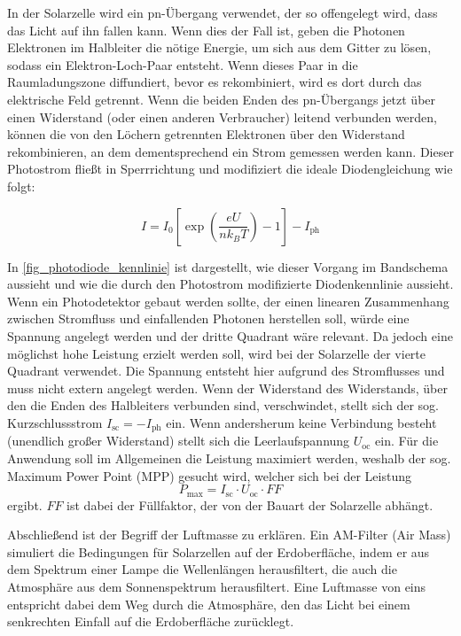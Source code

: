 \documentclass[
	a4paper,
	12pt,
	pagesize,
	ngerman
]{scrartcl}
\begin{document}
	In der Solarzelle wird ein pn-Übergang verwendet, der so offengelegt wird, dass das Licht auf ihn fallen kann.
	Wenn dies der Fall ist, geben die Photonen Elektronen im Halbleiter die nötige Energie, um sich aus dem Gitter zu lösen, sodass ein Elektron-Loch-Paar entsteht.
	Wenn dieses Paar in die Raumladungszone diffundiert, bevor es rekombiniert, wird es dort durch das elektrische Feld getrennt.
	Wenn die beiden Enden des pn-Übergangs jetzt über einen Widerstand (oder einen anderen Verbraucher) leitend verbunden werden, können die von den Löchern getrennten Elektronen über den Widerstand rekombinieren, an dem dementsprechend ein Strom gemessen werden kann.
	Dieser Photostrom fließt in Sperrrichtung und modifiziert die ideale Diodengleichung \label{eq_diode_real} wie folgt:

	\begin{equation}
			\label{eq_photostrom}
			I = I_0 \left[\exp{\left(\frac{eU}{n k_B T}\right)}-1\right]-I_\text{ph}
	\end{equation}

	In \cref{fig_photodiode_kennlinie} ist dargestellt, wie dieser Vorgang im Bandschema aussieht und wie die durch den Photostrom modifizierte Diodenkennlinie aussieht.
	Wenn ein Photodetektor gebaut werden sollte, der einen linearen Zusammenhang zwischen Stromfluss und einfallenden Photonen herstellen soll, würde eine Spannung angelegt werden und der dritte Quadrant wäre relevant.
	Da jedoch eine möglichst hohe Leistung erzielt werden soll, wird bei der Solarzelle der vierte Quadrant verwendet.
	Die Spannung entsteht hier aufgrund des Stromflusses und muss nicht extern angelegt werden.
	Wenn der Widerstand des Widerstands, über den die Enden des Halbleiters verbunden sind, verschwindet, stellt sich der sog. Kurzschlussstrom $ I_\text{sc} = - I_\text{ph}$ ein.
	Wenn andersherum keine Verbindung besteht (unendlich großer Widerstand) stellt sich die Leerlaufspannung $ U_\text{oc}$ ein.
	Für die Anwendung soll im Allgemeinen die Leistung maximiert werden, weshalb der sog. Maximum Power Point (MPP) gesucht wird, welcher sich bei der Leistung
	\begin{equation}
			\label{eq_mpp}
			P_\text{max} = I_\text{sc} \cdot U_\text{oc} \cdot FF
	\end{equation}
	ergibt.
	$FF$ ist dabei der Füllfaktor, der von der Bauart der Solarzelle abhängt.

	Abschließend ist der Begriff der Luftmasse zu erklären.
	Ein AM-Filter (Air Mass) simuliert die Bedingungen für Solarzellen auf der Erdoberfläche, indem er aus dem Spektrum einer Lampe die Wellenlängen herausfiltert, die auch die Atmosphäre aus dem Sonnenspektrum herausfiltert.
	Eine Luftmasse von eins entspricht dabei dem Weg durch die Atmosphäre, den das Licht bei einem senkrechten Einfall auf die Erdoberfläche zurücklegt.
\end{document}
